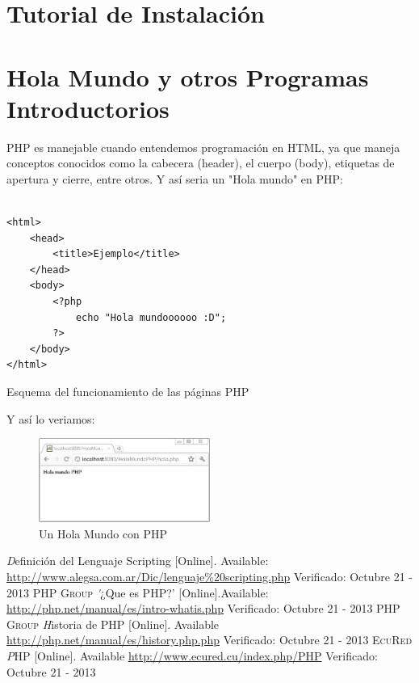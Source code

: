 \documentclass[11pt]{article} %
\begin{document}
\section{Tutorial de Instalación}

\section{Hola Mundo y otros Programas Introductorios}
PHP es manejable cuando entendemos programación en HTML, ya que maneja conceptos conocidos como la cabecera (header), el cuerpo (body), etiquetas de apertura y cierre, entre otros. Y así seria un "Hola mundo" en PHP:

\begin{lstlisting}[frame=single]  % Start your code-block

<html>
    <head>
        <title>Ejemplo</title>
    </head>
    <body>
        <?php
            echo "Hola mundoooooo :D";
        ?>
    </body>
</html>
\end{lstlisting}
\begin{center}
Esquema del funcionamiento de las páginas PHP \cite{[2]}
\end{center}
Y así lo veriamos:
\begin{figure}[H]
  \centering
    \includegraphics[width=0.5\textwidth]{Imagenes/HolaMundoPHP-Navegador}
  \caption{Un Hola Mundo con PHP}
  \label{fig:funcionamiento}
\end{figure}

\begin{thebibliography}{99}

\bibitem{[1]}  \textit Definición del Lenguaje Scripting [Online]. Available: \url{http://www.alegsa.com.ar/Dic/lenguaje%20scripting.php} Verificado: Octubre 21 - 2013
\bibitem{[2]}  \textsc{ PHP Group} \textit '¿Que es PHP?' [Online].Available: \url{http://php.net/manual/es/intro-whatis.php}  Verificado: Octubre 21 - 2013
\bibitem{[3]}  \textsc{ PHP Group} \textit Historia de PHP [Online]. Available \url{http://php.net/manual/es/history.php.php}  Verificado: Octubre 21 - 2013
\bibitem{[4]}  \textsc{ EcuRed} \textit PHP [Online]. Available \url{http://www.ecured.cu/index.php/PHP}  Verificado: Octubre 21 - 2013
\end{thebibliography}
\end{document}
